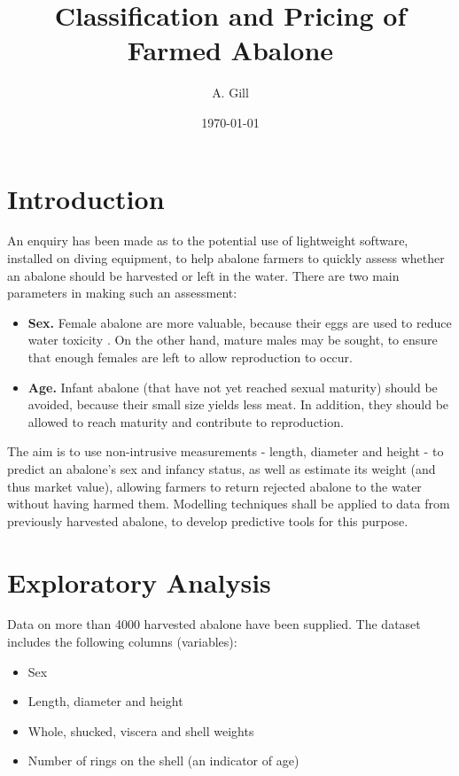 \documentclass[11pt, a4paper]{article}
\title{\large\bfseries Classification and Pricing of Farmed Abalone}
\author{\normalsize A. Gill}
\date{\small \today}
\begin{document}
    
    \maketitle

    \section*{Introduction}    
      
    An enquiry has been made as to the potential use of lightweight software, installed on diving equipment, to help abalone farmers to quickly assess whether an abalone should be harvested or left in the water. There are two main parameters in making such an assessment:

    \begin{itemize}
        \item \textbf{Sex.} Female abalone are more valuable, because their eggs are used to reduce water toxicity \parencite{atlantic}. On the other hand, mature males may be sought, to ensure that enough females are left to allow reproduction to occur.
        \item \textbf{Age.} Infant abalone (that have not yet reached sexual maturity) should be avoided, because their small size yields less meat. In addition, they should be allowed to reach maturity and contribute to reproduction.
    \end{itemize} 

    The aim is to use non-intrusive measurements - length, diameter and height - to predict an abalone's sex and infancy status, as well as estimate its weight (and thus market value), allowing farmers to return rejected abalone to the water without having harmed them. Modelling techniques shall be applied to data from previously harvested abalone, to develop predictive tools for this purpose.

    \section{Exploratory Analysis}

    Data on more than 4000 harvested abalone have been supplied. The dataset includes the following columns (variables):

    \begin{itemize}
        \item Sex
        \item Length, diameter and height
        \item Whole, shucked, viscera and shell weights
        \item Number of rings on the shell (an indicator of age)
    \end{itemize}
\end{document}
